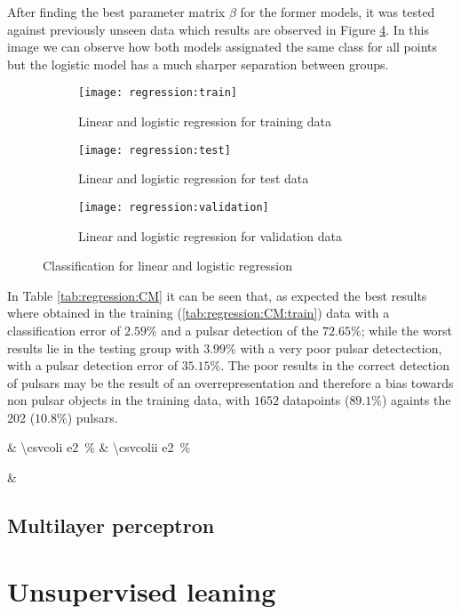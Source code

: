 \documentclass[journal]{IEEEtran}
\newcommand\percentage[2][round-precision = 2]{%
    \SI[round-mode = places,
        scientific-notation = fixed, fixed-exponent = 0,
        output-decimal-marker={.}, #1]{#2e2}{\percent}%
}
\begin{document}
After finding the best parameter matrix $\beta$ for the former models, it was
tested against previously unseen data which results are observed in Figure
\ref{fig:regression}. In this image we can observe how both models assignated
the same class for all points but the logistic model has a much sharper
separation between groups. 

\begin{figure}[ht]
    \begin{subfigure}[b]{\linewidth}
        \texttt{[image: regression:train]}
        \caption{Linear and logistic regression for training data
        \label{fig:regression:train}}
    \end{subfigure}
    \begin{subfigure}[b]{\linewidth}
        \texttt{[image: regression:test]}
        \caption{Linear and logistic regression for test data
        \label{fig:regression:test}}
    \end{subfigure}
    \begin{subfigure}[b]{\linewidth}
        \texttt{[image: regression:validation]}
        \caption{Linear and logistic regression for validation data
        \label{fig:regression:validation}}
    \end{subfigure}
    \caption{Classification for linear and logistic regression
        \label{fig:regression}}
\end{figure}

In Table \ref{tab:regression:CM} it can be seen that, as expected the best
results where obtained in the training (\ref{tab:regression:CM:train}) data with
a classification error of $2.59\%$ and a pulsar detection of the $72.65\%$;
while the worst results lie in the testing group with $3.99\%$ with a very poor
pulsar detectection, with a pulsar detection error of $35.15\%$. The poor
results in the correct detection of pulsars may be the result of an
overrepresentation and therefore a bias towards non pulsar objects in the
training data, with $1652$ datapoints ($89.1\%$) againts the 202 ($10.8\%$)
pulsars.

\csvreader[
    centered tabular=lll,
    no head,column count=3,
    table head=\hline & F & T \\\hline,
    late after line=\\\hline]%
{../tables/regression:CM:test.csv}{}%
{ & \percentage{\csvcoli} & \percentage{\csvcolii}}%

\csvreader[
    centered tabular=ll,
    no head,column count=2,
    table head=\hline Index & Value \\\hline,
    late after line=\\\hline]%
{../tables/regression:index:test.csv}{}%
{\csvcoli & \csvcolii}%

\subsection{Multilayer perceptron\label{sec:nn}}

\section{Unsupervised leaning\label{sec:unsupervised}}
\printbibliography
\end{document}
